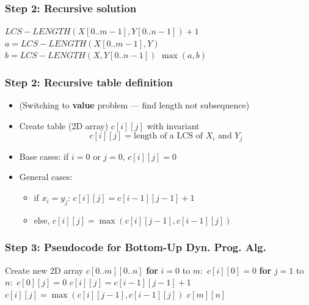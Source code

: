 \documentclass{beamer}
\begin{document}
\begin{frame} \frametitle{Step 2: Recursive solution}
  \begin{algorithmic}[1]
      \State {}
    \EndIf
    \State \Return $LCS-LENGTH(X[0..m-1], Y[0..n-1]) + 1$
    \EndIf
    \State $a = LCS-LENGTH(X[0..m-1], Y)$
    \State $b = LCS-LENGTH(X, Y[0..n-1])$
    \State \Return $\max(a, b)$
    \EndFunction
  \end{algorithmic}  
\end{frame}

\begin{frame} \frametitle{Step 2: Recursive table definition}
  \begin{itemize}
  \item (Switching to \textbf{value} problem --- find length not subsequence)
  \item Create table (2D array) $c[i][j]$ with invariant
    \[ c[i][j] = \text{length of a LCS of } X_i \text{ and } Y_j \]
  \item Base cases: if $i=0$ or $j=0$, $c[i][j]=0$
  \item General cases:
    \begin{itemize}
    \item if $x_i=y_j$: $c[i][j] = c[i-1][j-1]+1$
    \item else, $c[i][j] = \max(c[i][j-1], c[i-1][j])$
    \end{itemize}
  \end{itemize}
\end{frame}

\begin{frame} \frametitle{Step 3: Pseudocode for \textbf{Bottom-Up} Dyn. Prog. Alg.}
  \begin{algorithmic}[1]
    \State Create new 2D array $c[0..m][0..n]$
    \State \textbf{for} $i=0$ to $m:$ $c[i][0] = 0$
    \State \textbf{for} $j=1$ to $n:$ $c[0][j] = 0$
          \State $c[i][j] = c[i-1][j-1]+1$
        \Else
          \State $c[i][j] = \max(c[i][j-1], c[i-1][j])$
        \EndIf
      \EndFor  
    \EndFor
    \State \Return $c[m][n]$
    \EndFunction
  \end{algorithmic}
\end{frame}
\end{document}
